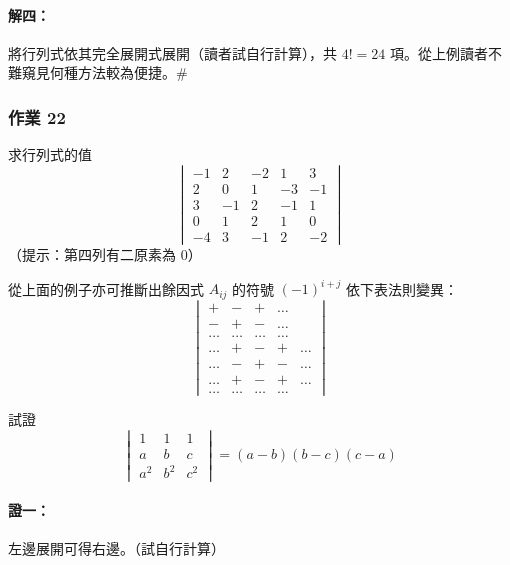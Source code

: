 \paragraph{解四：}將行列式依其完全展開式展開（讀者試自行計算），共 $4! = 24$ 項。從上例讀者不難窺見何種方法較為便捷。\hfill$\#$

\subsubsection*{作業 22}\label{hw:b6-1-22}
求行列式的值
\[ \begin{vmatrix}
-1 & 2 & -2 & 1 & 3 \\
2 & 0 & 1 & -3 & -1 \\
3 & -1 & 2 & -1 & 1 \\
0 & 1 & 2 & 1 & 0 \\
-4 & 3 & -1 & 2 & -2
\end{vmatrix} \]
（提示：第四列有二原素為 0）

從上面的例子亦可推斷出餘因式 $A_{ij}$ 的符號 $(-1)^{i+j}$ 依下表法則變異：
\begin{equation}
\begin{vmatrix}
+ & - & + & \dots \\
- & + & - & \dots \\
\dots & \dots & \dots & \dots \\
\dots & + & - & + & \dots \\
\dots & - & + & - & \dots \\
\dots & + & - & + & \dots \\
\dots & \dots & \dots & \dots
\end{vmatrix} \label{eq:b6-1-6-19}
\end{equation}

\begin{example}\label{ex:b6-1-30}
試證
\[ \begin{vmatrix}
1 & 1 & 1 \\
a & b & c \\
a^2 & b^2 & c^2
\end{vmatrix} = (a-b)(b-c)(c-a) \]
\end{example}

\paragraph{證一：}左邊展開可得右邊。（試自行計算）

